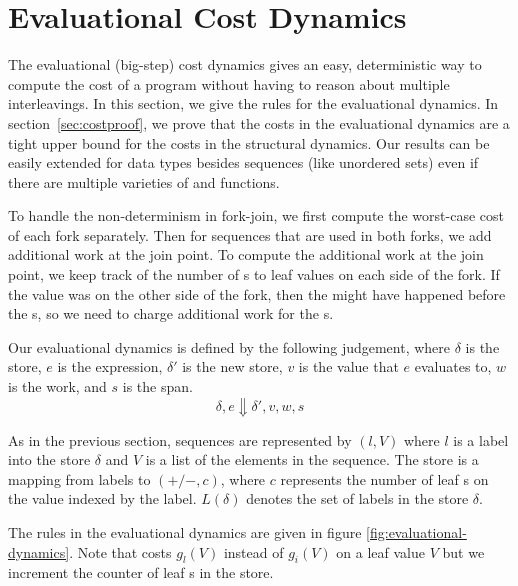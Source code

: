 \section{Evaluational Cost Dynamics}
\label{sec:evaluational}

The evaluational (big-step) cost dynamics gives an easy, deterministic way to compute the cost of a program without having to reason about multiple interleavings. In this section, we give the rules for the evaluational dynamics. In section~\ref{sec:costproof}, we prove that the costs in the evaluational dynamics are a tight upper bound for the costs in the structural dynamics. Our results can be easily extended for data types besides sequences (like unordered sets) even if there are multiple varieties of \get{} and \set{} functions.

To handle the non-determinism in fork-join, we first compute the worst-case cost of each fork separately. Then for sequences that are used in both forks, we add additional work at the join point. To compute the additional work at the join point, we keep track of the number of \get{}s to leaf values on each side of the fork. If the value was \set{} on the other side of the fork, then the \set{} might have happened before the \get{}s, so we need to charge additional work for the \get{}s.

Our evaluational dynamics is defined by the following judgement, where $\delta$ is the store, $e$ is the expression, $\delta'$ is the new store, $v$ is the value that $e$ evaluates to, $w$ is the work, and $s$ is the span.
$$\delta, e \boldsymbol\Downarrow \delta', v, w, s$$

As in the previous section, sequences are represented by $(l, V)$ where $l$ is a label into the store $\delta$ and $V$ is a list of the elements in the sequence. The store is a mapping from labels to $(+/-, c)$, where $c$ represents the number of leaf \get{}s on the value indexed by the label. $L(\delta)$ denotes the set of labels in the store $\delta$.

The rules in the evaluational dynamics are given in figure \ref{fig:evaluational-dynamics}. Note that \get{} costs $g_l(V)$ instead of $g_i(V)$ on a leaf value $V$ but we increment the counter of leaf \get{}s in the store. 

